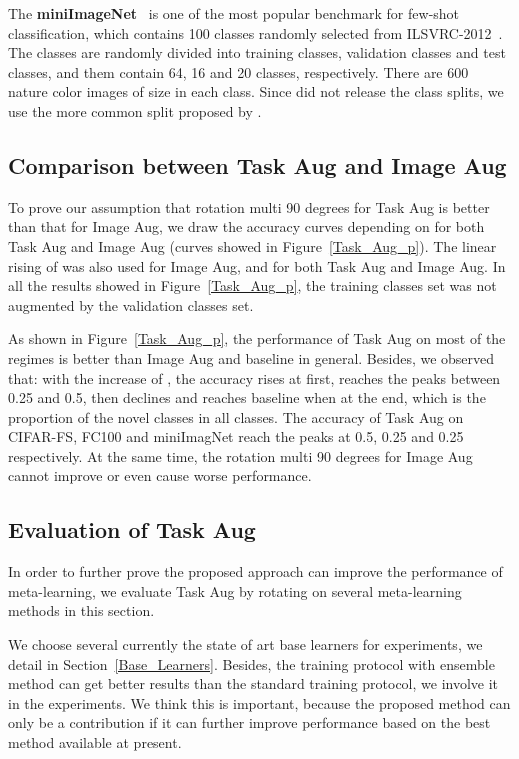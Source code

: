 \documentclass[10pt,twocolumn,letterpaper]{article}
\begin{document}
The \textbf{miniImageNet}~\cite{vinyals2016matching} is one of the most popular benchmark for few-shot classification, which contains 100 classes randomly selected from ILSVRC-2012~\cite{russakovsky2015imagenet}. The classes are randomly divided into training classes, validation classes and test classes, and them contain 64, 16 and 20 classes, respectively. There are 600 nature color images of size  in each class. Since \cite{vinyals2016matching} did not release the class splits, we use the more common split proposed by \cite{ravi2017optimization}.



\subsection{Comparison between Task Aug and Image Aug}
To prove our assumption that rotation multi 90 degrees for Task Aug is better than that for Image Aug, we draw the accuracy curves depending on  for both Task Aug and Image Aug (curves showed in Figure~\ref{Task_Aug_p}). The linear rising of  was also used for Image Aug, and  for both Task Aug and Image Aug. In all the results showed in Figure~\ref{Task_Aug_p}, the training classes set was not augmented by the validation classes set.

As shown in Figure~\ref{Task_Aug_p}, the performance of Task Aug on most of the regimes is better than Image Aug and baseline in general. Besides, we observed that: with the increase of , the accuracy rises at first, reaches the peaks between 0.25 and 0.5, then declines and reaches baseline when  at the end, which is the proportion of the novel classes in all classes. The accuracy of Task Aug on CIFAR-FS, FC100 and miniImagNet reach the peaks at 0.5, 0.25 and 0.25 respectively. At the same time, the rotation multi 90 degrees for Image Aug cannot improve or even cause worse performance. 

\subsection{Evaluation of Task Aug}
In order to further prove the proposed approach can improve the performance of meta-learning, we evaluate Task Aug by rotating on several meta-learning methods in this section.

We choose several currently the state of art base learners for experiments, we detail in Section~\ref{Base_Learners}. Besides, the training protocol with ensemble method can get better results than the standard training protocol, we involve it in the experiments. We think this is important, because the proposed method can only be a contribution if it can further improve performance based on the best method available at present.
\end{document}

